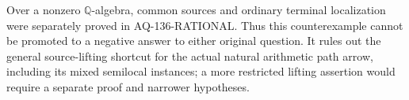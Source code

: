 Over a nonzero $\mathbb Q$-algebra, common sources and ordinary
terminal localization were separately proved in AQ-136-RATIONAL.
Thus this counterexample cannot be promoted to a negative answer
to either original question. It rules out the general source-lifting
shortcut for the actual natural arithmetic path arrow, including
its mixed semilocal instances; a more restricted lifting assertion
would require a separate proof and narrower hypotheses.

